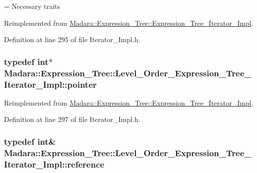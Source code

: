 = Necessary traits 



Reimplemented from \hyperlink{classMadara_1_1Expression__Tree_1_1Expression__Tree__Iterator__Impl_a59d9cb2efd705e21684d901de09399c7}{Madara::Expression\_\-Tree::Expression\_\-Tree\_\-Iterator\_\-Impl}.



Definition at line 295 of file Iterator\_\-Impl.h.

\hypertarget{classMadara_1_1Expression__Tree_1_1Level__Order__Expression__Tree__Iterator__Impl_ae3a0bea55dc4f3654e6c2e1d79705ecb}{
\subsubsection[{pointer}]{\setlength{\rightskip}{0pt plus 5cm}typedef int$\ast$ {\bf Madara::Expression\_\-Tree::Level\_\-Order\_\-Expression\_\-Tree\_\-Iterator\_\-Impl::pointer}}}
\label{dc/de7/classMadara_1_1Expression__Tree_1_1Level__Order__Expression__Tree__Iterator__Impl_ae3a0bea55dc4f3654e6c2e1d79705ecb}


Reimplemented from \hyperlink{classMadara_1_1Expression__Tree_1_1Expression__Tree__Iterator__Impl_a33e128179eed32fd363d0f426ed313a1}{Madara::Expression\_\-Tree::Expression\_\-Tree\_\-Iterator\_\-Impl}.



Definition at line 297 of file Iterator\_\-Impl.h.

\hypertarget{classMadara_1_1Expression__Tree_1_1Level__Order__Expression__Tree__Iterator__Impl_a6aff68baa7a2f6732ffd795bd08379b6}{
\subsubsection[{reference}]{\setlength{\rightskip}{0pt plus 5cm}typedef int\& {\bf Madara::Expression\_\-Tree::Level\_\-Order\_\-Expression\_\-Tree\_\-Iterator\_\-Impl::reference}}}
\label{dc/de7/classMadara_1_1Expression__Tree_1_1Level__Order__Expression__Tree__Iterator__Impl_a6aff68baa7a2f6732ffd795bd08379b6}


